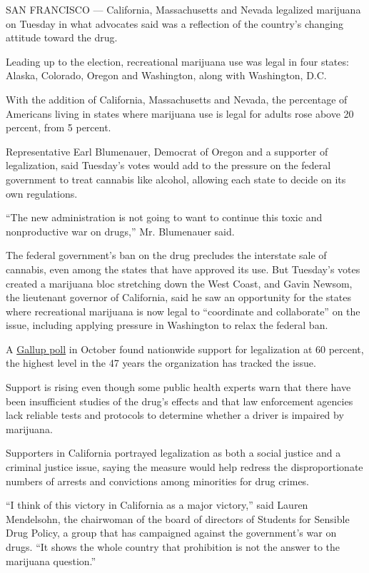 SAN FRANCISCO --- California, Massachusetts and Nevada legalized
marijuana on Tuesday in what advocates said was a reflection of the
country's changing attitude toward the drug.

Leading up to the election, recreational marijuana use was legal in four
states: Alaska, Colorado, Oregon and Washington, along with Washington,
D.C.

With the addition of California, Massachusetts and Nevada, the
percentage of Americans living in states where marijuana use is legal
for adults rose above 20 percent, from 5 percent.

Representative Earl Blumenauer, Democrat of Oregon and a supporter of
legalization, said Tuesday's votes would add to the pressure on the
federal government to treat cannabis like alcohol, allowing each state
to decide on its own regulations.

``The new administration is not going to want to continue this toxic and
nonproductive war on drugs,'' Mr. Blumenauer said.

The federal government's ban on the drug precludes the interstate sale
of cannabis, even among the states that have approved its use. But
Tuesday's votes created a marijuana bloc stretching down the West Coast,
and Gavin Newsom, the lieutenant governor of California, said he saw an
opportunity for the states where recreational marijuana is now legal to
``coordinate and collaborate'' on the issue, including applying pressure
in Washington to relax the federal ban.

A
\href{http://www.gallup.com/poll/196550/support-legal-marijuana.aspx}{Gallup
poll} in October found nationwide support for legalization at 60
percent, the highest level in the 47 years the organization has tracked
the issue.

Support is rising even though some public health experts warn that there
have been insufficient studies of the drug's effects and that law
enforcement agencies lack reliable tests and protocols to determine
whether a driver is impaired by marijuana.

Supporters in California portrayed legalization as both a social justice
and a criminal justice issue, saying the measure would help redress the
disproportionate numbers of arrests and convictions among minorities for
drug crimes.

``I think of this victory in California as a major victory,'' said
Lauren Mendelsohn, the chairwoman of the board of directors of Students
for Sensible Drug Policy, a group that has campaigned against the
government's war on drugs. ``It shows the whole country that prohibition
is not the answer to the marijuana question.''

